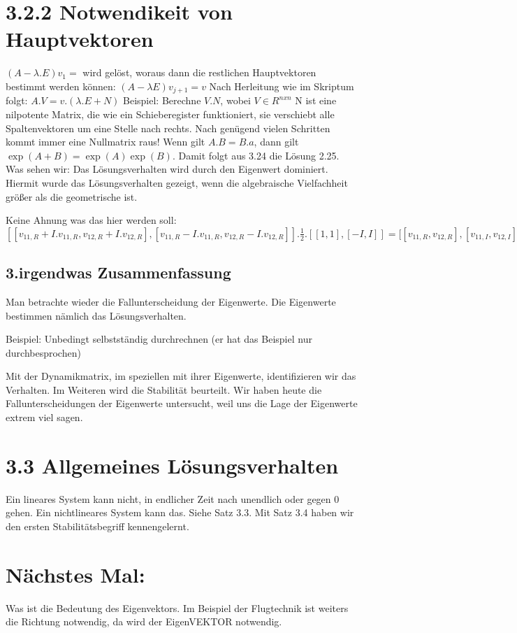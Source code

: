 \documentclass[a4paper]{article}
\begin{document}
\section*{3.2.2 Notwendikeit von Hauptvektoren}
$(A-\lambda .E)v_1=$ wird gelöst, woraus dann die restlichen Hauptvektoren bestimmt werden können:
$(A-\lambda E)v_{j+1}=v$
Nach Herleitung wie im Skriptum folgt:
 $A.V=v.(\lambda.E+N)$
 Beispiel:  Berechne $V.N$, wobei  $V \in R^{n x n}$
N ist eine nilpotente Matrix, die wie ein Schieberegister funktioniert, sie verschiebt alle Spaltenvektoren um eine Stelle nach rechts. Nach genügend vielen Schritten kommt immer eine Nullmatrix raus!
\newline
Wenn gilt $A.B=B.a$, dann gilt $\exp(A+B)=\exp(A)\exp(B)$. Damit folgt aus 3.24 die Lösung 2.25.
Was sehen wir: Das Lösungsverhalten wird durch den Eigenwert dominiert. Hiermit wurde das Lösungsverhalten gezeigt, wenn die algebraische Vielfachheit größer als die geometrische ist.

 Keine Ahnung was das hier werden soll:
 $[[v_{11,R}+I.v_{11,R}, v_{12,R}+I.v_{12,R}], [v_{11,R}-I.v_{11,R}, v_{12,R}-I.v_{12,R}]].\frac{1}{2}.[[1, 1], [-I, I]]=[[v_{11,R}, v_{12,R}],[v_{11,I}, v_{12,I}]$

 \subsection*{3.irgendwas Zusammenfassung}
 Man betrachte wieder die Fallunterscheidung der Eigenwerte. Die Eigenwerte bestimmen nämlich das Lösungsverhalten.\newline

Beispiel: Unbedingt selbstständig durchrechnen (er hat das Beispiel nur durchbesprochen)

Mit der Dynamikmatrix, im speziellen mit ihrer Eigenwerte, identifizieren wir das Verhalten. Im Weiteren wird die Stabilität beurteilt. Wir haben heute die Fallunterscheidungen der Eigenwerte untersucht, weil uns die Lage der Eigenwerte extrem viel sagen.
\section*{3.3 Allgemeines Lösungsverhalten}
Ein lineares System kann nicht, in endlicher Zeit nach unendlich oder gegen 0 gehen. Ein nichtlineares System kann das. Siehe Satz 3.3. Mit Satz 3.4 haben wir den ersten Stabilitätsbegriff kennengelernt.

\section*{Nächstes Mal:}
Was ist die Bedeutung des Eigenvektors. Im Beispiel der Flugtechnik ist weiters die Richtung notwendig, da wird der EigenVEKTOR notwendig.
\end{document}
